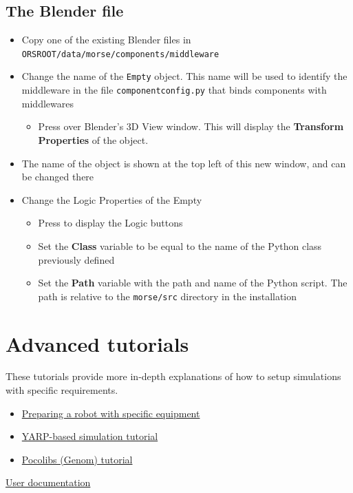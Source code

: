 \documentclass[twoside,a4paper,10pt]{report}
\newcommand{\key}[1]{\fcolorbox{Dark}{Light}{\textbf{#1}}}
\newcommand{\dokutitlelevelone}[1]{\chapter{#1}}
\newcommand{\dokutitleleveltwo}[1]{\section{#1}}
\newcommand{\dokubold}[1]{\textbf{#1}}
\newcommand{\dokumonospace}[1]{\texttt{#1}}
\newcommand{\dokuitem}{\item}
\newcommand{\dokuquoting}{\textbar}
\begin{document}
\dokutitleleveltwo{The Blender file}
\label{a22b5e3241d0ad2ab4f289b4afb21de7}%

\begin{itemize}
\dokuitem  Copy one of the existing Blender files in \dokumonospace{{\textdollar}ORS{\textunderscore}ROOT/data/morse/components/middleware}
\end{itemize}

\begin{itemize}
\dokuitem  Change the name of the \dokumonospace{Empty} object. This name will be used to identify the middleware in the file \dokumonospace{component{\textunderscore}config.py} that binds components with middlewares
\begin{itemize}
\dokuitem  Press \key{N} over Blender's 3D View window. This will display the \dokubold{Transform Properties} of the object.
\end{itemize}

\dokuitem  The name of the object is shown at the top left of this new window, and can be changed there
\end{itemize}

\begin{itemize}
\dokuitem  Change the Logic Properties of the Empty
\begin{itemize}
\dokuitem  Press \key{F4} to display the Logic buttons
\dokuitem  Set the \dokubold{Class} variable to be equal to the name of the Python class previously defined
\dokuitem  Set the \dokubold{Path} variable with the path and name of the Python script. The path is relative to the \dokumonospace{morse/src} directory in the installation
\end{itemize}

\end{itemize}
\dokutitlelevelone{Advanced tutorials}
\label{1db3103f04a8f50e1168ef3c23748f71}%
\label{1db3103f04a8f50e1168ef3c23748f71}%

These tutorials provide more in-depth explanations of how to setup simulations with specific requirements.



\begin{itemize}
\dokuitem  \hyperref[feb94730bf2c8bc6803a472bb56691ae]{ Preparing a robot with specific equipment}
\dokuitem  \hyperref[1dd029a60f7f3dd1deaf993ce4538edf]{ YARP-based simulation tutorial}
\dokuitem  \hyperref[5c7d3aeca93d2be4626b023df992dc1d]{ Pocolibs (Genom) tutorial}
\end{itemize}
{\dokuquoting}{\dokuquoting} \hyperref[a80da1282f2c775bbc5f2c92c836968b]{ User documentation}
\end{document}
